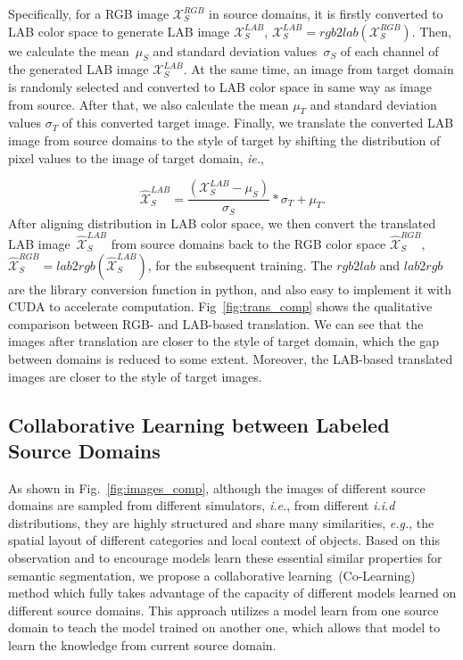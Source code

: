 \documentclass[final]{cvpr}
\def\ie{\textit{i.e.}}
\def\eg{\textit{e.g.}}
\def\X{\mathcal{X}}
\begin{document}
Specifically, for a RGB image $\X_S^{RGB}$ in source domains, it is firstly converted to LAB color space to generate LAB image $\X_S^{LAB}$, $\X_S^{LAB} = rgb2lab(\X_S^{RGB})$. Then, we calculate the mean~$\mu_S$ and standard deviation values~$\sigma_S$ of each channel of the generated LAB image $\X_S^{LAB}$. At the same time, an image from target domain is randomly selected and converted to LAB color space in same way as image from source. After that, we also calculate the mean $\mu_T$ and standard deviation values $\sigma_T$ of this converted target image. Finally, we translate the converted LAB image from source domains to the style of target by shifting the distribution of pixel values to the image of target domain, \textit{ie.},

\begin{equation}
	\hat{\X}^{LAB}_S = \frac{(\X_S^{LAB} - \mu_S)}{\sigma_S} * \sigma_T + \mu_T.
\end{equation}
After aligning distribution in LAB color space, we then convert the translated LAB image~$\hat{\X}^{LAB}_S$  from source domains back to the RGB color space $\hat{\X}_S^{RGB}$, $\hat{\X}_S^{RGB}=lab2rgb(\hat{\X}_S^{LAB})$, for the subsequent training. The $rgb2lab$ and $lab2rgb$ are the library conversion function in python, and also easy to implement it with CUDA to accelerate computation. Fig~\ref{fig:trans_comp} shows the qualitative comparison between RGB- and LAB-based translation. We can see that the images after translation are closer to the style of target domain, which the gap between domains is reduced to some extent. Moreover, the LAB-based translated images are closer to the style of target images.


\subsection{Collaborative Learning between Labeled Source Domains}

As shown in Fig.~\ref{fig:images_comp}, although the images of different source domains are sampled from different simulators, \ie, from different \textit{i.i.d} distributions, they are highly structured and share many similarities, \eg, the spatial layout of different categories and local context of objects. Based on this observation and to encourage models learn these essential similar properties for semantic segmentation, we propose a collaborative learning~(Co-Learning) method which fully takes advantage of the capacity of different models learned on different source domains. This approach utilizes a model learn from one source domain to teach the model trained on another one, which allows that model to learn the knowledge from current source domain. 
\end{document}
